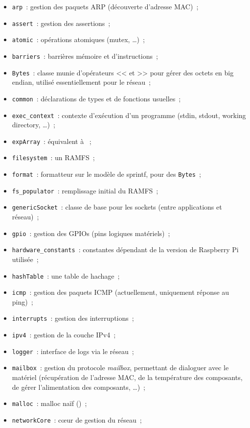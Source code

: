 \documentclass[11pt,a4paper]{article}
\begin{document}
\begin{itemize}
	\item \texttt{arp}~: gestion des paquets ARP (découverte d'adresse MAC)~;
	\item \texttt{assert}~: gestion des assertions~;
	\item \texttt{atomic}~: opérations atomiques (mutex, \ldots)~;
	\item \texttt{barriers}~: barrières mémoire et d'instructions~;
	\item \texttt{Bytes}~: classe munie d'opérateurs << et >> pour gérer des
		octets en big endian, utilisé essentiellement pour le réseau~;
	\item \texttt{common}~: déclarations de types et de fonctions usuelles~;
	\item \texttt{exec\_context}~: contexte d'exécution d'un programme
		(stdin, stdout, working directory, \ldots)~;
	\item \texttt{expArray}~: équivalent à ~;
	\item \texttt{filesystem}~: un RAMFS~;
	\item \texttt{format}~: formatteur sur le modèle de sprintf, pour des
		\texttt{Bytes}~;
	\item \texttt{fs\_populator}~: remplissage initial du RAMFS~;
	\item \texttt{genericSocket}~: classe de base pour les sockets (entre
		applications et réseau)~;
	\item \texttt{gpio}~: gestion des GPIOs (pins logiques matériels)~;
	\item \texttt{hardware\_constants}~: constantes dépendant de la version
		de Raspberry Pi utilisée~;
	\item \texttt{hashTable}~: une table de hachage~;
	\item \texttt{icmp}~: gestion des paquets ICMP (actuellement, uniquement
		réponse au ping)~;
	\item \texttt{interrupts}~: gestion des interruptions~;
	\item \texttt{ipv4}~: gestion de la couche IPv4~;
	\item \texttt{logger}~: interface de logs via le réseau~;
	\item \texttt{mailbox}~: gestion du protocole \textit{mailbox}, permettant
		de dialoguer avec le matériel (récupération de l'adresse MAC, 
		de la température des composants, de gérer l'alimentation des
		composants, \ldots)~;
	\item \texttt{malloc}~: malloc naïf ()~;
	\item \texttt{networkCore}~: cœur de gestion du réseau~;

\end{itemize}
\end{document}

